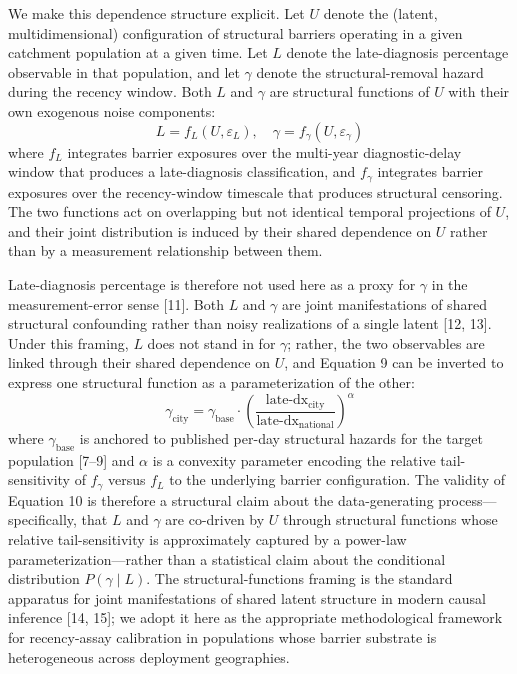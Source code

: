 \documentclass[12pt]{article}
\begin{document}
We make this dependence structure explicit. Let $U$ denote the (latent, multidimensional) configuration of structural barriers operating in a given catchment population at a given time. Let $L$ denote the late-diagnosis percentage observable in that population, and let $\gamma$ denote the structural-removal hazard during the recency window. Both $L$ and $\gamma$ are structural functions of $U$ with their own exogenous noise components:
\begin{equation}
L = f_L(U, \varepsilon_L), \quad \gamma = f_\gamma(U, \varepsilon_\gamma)
\end{equation}
where $f_L$ integrates barrier exposures over the multi-year diagnostic-delay window that produces a late-diagnosis classification, and $f_\gamma$ integrates barrier exposures over the recency-window timescale that produces structural censoring. The two functions act on overlapping but not identical temporal projections of $U$, and their joint distribution is induced by their shared dependence on $U$ rather than by a measurement relationship between them.

Late-diagnosis percentage is therefore not used here as a proxy for $\gamma$ in the measurement-error sense [11]. Both $L$ and $\gamma$ are joint manifestations of shared structural confounding rather than noisy realizations of a single latent [12, 13]. Under this framing, $L$ does not stand in for $\gamma$; rather, the two observables are linked through their shared dependence on $U$, and Equation 9 can be inverted to express one structural function as a parameterization of the other:
\begin{equation}
\gamma_{\mathrm{city}} = \gamma_{\mathrm{base}} \cdot \left(\frac{\text{late-dx}_{\mathrm{city}}}{\text{late-dx}_{\mathrm{national}}}\right)^{\alpha}
\end{equation}
where $\gamma_{\mathrm{base}}$ is anchored to published per-day structural hazards for the target population [7--9] and $\alpha$ is a convexity parameter encoding the relative tail-sensitivity of $f_\gamma$ versus $f_L$ to the underlying barrier configuration. The validity of Equation 10 is therefore a structural claim about the data-generating process---specifically, that $L$ and $\gamma$ are co-driven by $U$ through structural functions whose relative tail-sensitivity is approximately captured by a power-law parameterization---rather than a statistical claim about the conditional distribution $P(\gamma \mid L)$. The structural-functions framing is the standard apparatus for joint manifestations of shared latent structure in modern causal inference [14, 15]; we adopt it here as the appropriate methodological framework for recency-assay calibration in populations whose barrier substrate is heterogeneous across deployment geographies.
\end{document}
